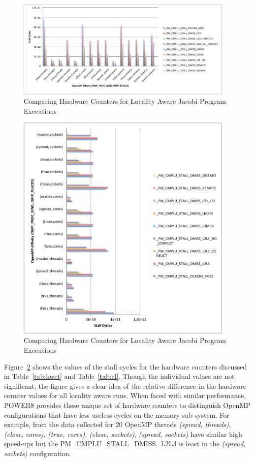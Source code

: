 \begin{figure}[h!]
  \centering
  \includegraphics[height=0.4\textwidth, width=0.95\textwidth]{./Images/AllHW1.pdf}
       \caption{Comparing Hardware Counters for Locality Aware Jacobi Program  Executions}
       \label{fig:HW1}
\end{figure}
\begin{figure}[h!]
  \centering
  \includegraphics[height=1\textwidth, width=0.95\textwidth]{./Images/AllHW2.pdf}
       \caption{Comparing Hardware Counters for Locality Aware Jacobi Program  Executions}
       \label{fig:HW2}
\end{figure}
Figure~\ref{fig:HW2} shows the values of the stall cycles for the hardware counters discussed in Table~\ref{tab:hwct} and Table~\ref{tab:cl}. Though the individual values are not significant, the figure gives a clear idea of the relative difference in the hardware counter values for all locality aware runs. 
When faced with similar performance, POWER8 provides these unique set of hardware counters to distinguish OpenMP configurations that have less useless cycles on the memory sub-system. For example, from the data collected for 20 OpenMP threads \textit{(spread, threads)},  \textit{(close, cores)}, \textit{(true, cores)},  \textit{(close, sockets)}, \textit{(spread, sockets)} have similar high speed-ups but the PM\_CMPLU\_STALL\_DMISS\_L2L3 is least in the \textit{(spread, sockets)} configuration. 


